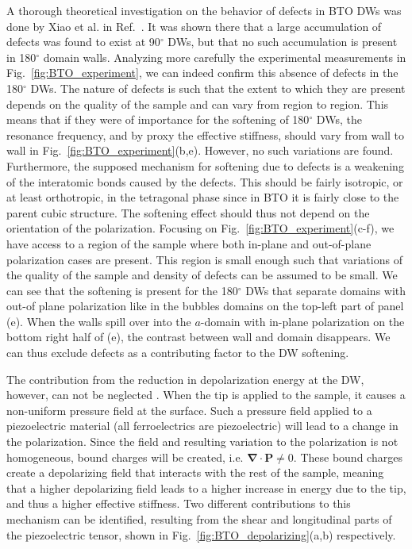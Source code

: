 A thorough theoretical investigation on the behavior of defects in BTO DWs was done by Xiao et al. in Ref.~\cite{Xiao2005}.
It was shown there that a large accumulation of defects was found to exist at 90$^\circ$ DWs, but that no such accumulation is present in 180$^\circ$ domain walls.
Analyzing more carefully the experimental measurements in Fig.~\ref{fig:BTO_experiment}, we can indeed confirm this absence of defects in the 180$^\circ$ DWs.
The nature of defects is such that the extent to which they are present depends on the quality of the sample and can vary from region to region.
This means that if they were of importance for the softening of 180$^\circ$ DWs, the resonance frequency, and by proxy the effective stiffness, should vary from wall to wall in Fig.~\ref{fig:BTO_experiment}(b,e).
However, no such variations are found.
Furthermore, the supposed mechanism for softening due to defects is a weakening of the interatomic bonds caused by the defects.
This should be fairly isotropic, or at least orthotropic, in the tetragonal phase since in BTO it is fairly close to the parent cubic structure.
The softening effect should thus not depend on the orientation of the polarization.
Focusing on Fig.~\ref{fig:BTO_experiment}(c-f), we have access to a region of the sample where both in-plane and out-of-plane polarization cases are present.
This region is small enough such that variations of the quality of the sample and density of defects can be assumed to be small.
We can see that the softening is present for the 180$^\circ$ DWs that separate domains with out-of plane polarization like in the bubbles domains on the top-left part of panel (e).
When the walls spill over into the $a$-domain with in-plane polarization on the bottom right half of (e), the contrast between wall and domain disappears.
We can thus exclude defects as a contributing factor to the DW softening.

The contribution from the reduction in depolarization energy at the DW, however, can not be neglected \cite{Tsuji2005,Stefani2020}.
When the tip is applied to the sample, it causes a non-uniform pressure field at the surface.
Such a pressure field applied to a piezoelectric material (all ferroelectrics are piezoelectric) will lead to a change in the polarization.
Since the field and resulting variation to the polarization is not homogeneous, bound charges will be created, i.e. $\bm{\nabla} \cdot \bm{P} \neq 0$.
These bound charges create a depolarizing field that interacts with the rest of the sample, meaning that a higher depolarizing field leads to a higher increase in energy due to the tip, and thus a higher effective stiffness.
Two different contributions to this mechanism can be identified, resulting from the shear and longitudinal parts of the piezoelectric tensor, shown in Fig.~\ref{fig:BTO_depolarizing}(a,b) respectively.

